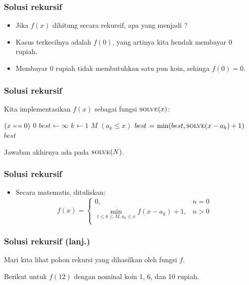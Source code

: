 \begin{frame}
\frametitle{Solusi rekursif}
\begin{itemize}
  \item Jika $f(x)$ dihitung secara rekursif, apa yang menjadi \fbasecase?
  \item Kasus terkecilnya adalah $f(0)$, yang artinya kita hendak membayar 0 rupiah.
  \item Membayar 0 rupiah tidak membutuhkan satu pun koin, sehinga $f(0) = 0$.
\end{itemize}
\end{frame}

\begin{frame}
\frametitle{Solusi rekursif}
Kita implementasikan $f(x)$ sebagai fungsi $\textnormal{\scshape solve}(x)$:
\begin{codebox}
\li \If $(x \isequal 0)$ \Then
\li   \Return $0$
\li \Else
\li   $best \gets \infty$
\li   \For $k \gets 1$ \To $M$ \Do
\li     \If $(a_k \leq x)$ \Then
\li       $best \mathrel{\hspace{1pt}=\hspace{1pt}} \min(best, \textnormal{\scshape solve}(x - a_k) + 1)$
        \End
      \End
\li   \Return $best$
    \End
\end{codebox}

Jawaban akhirnya ada pada $\textnormal{\scshape solve}(N)$.
\end{frame}

\begin{frame}
\frametitle{Solusi rekursif}
\begin{itemize}
  \item Secara matematis, dituliskan:
   \[f(x) = \left\{\begin{array}{lr}
        0, & n = 0\\
        \min_{1 \leq k \leq M, a_k \leq x} {f(x - a_k) + 1}, & n > 0\\
        \end{array}\right. \]
 \end{itemize}
\end{frame}

\begin{frame} [fragile]
\frametitle{Solusi rekursif (lanj.)}
Mari kita lihat pohon rekursi yang dihasilkan oleh fungsi $f$. 

Berikut untuk $f(12)$ dengan nominal koin 1, 6, dan 10 rupiah.

\begin{center}
\end{center}
\end{frame}

